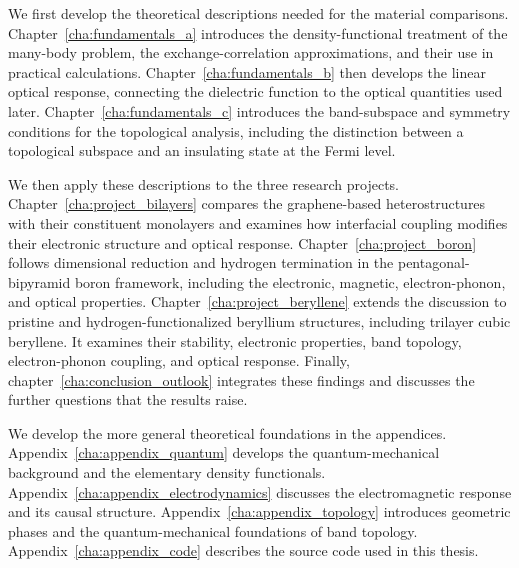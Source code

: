 We first develop the theoretical descriptions needed for the material comparisons.
Chapter~\ref{cha:fundamentals_a} introduces the density-functional treatment of the many-body problem, the exchange-correlation approximations, and their use in practical calculations.
Chapter~\ref{cha:fundamentals_b} then develops the linear optical response, connecting the dielectric function to the optical quantities used later.
Chapter~\ref{cha:fundamentals_c} introduces the band-subspace and symmetry conditions for the topological analysis, including the distinction between a topological subspace and an insulating state at the Fermi level.

We then apply these descriptions to the three research projects.
Chapter~\ref{cha:project_bilayers} compares the graphene-based heterostructures with their constituent monolayers and examines how interfacial coupling modifies their electronic structure and optical response.
Chapter~\ref{cha:project_boron} follows dimensional reduction and hydrogen termination in the pentagonal-bipyramid boron framework, including the electronic, magnetic, electron-phonon, and optical properties.
Chapter~\ref{cha:project_beryllene} extends the discussion to pristine and hydrogen-functionalized beryllium structures, including trilayer cubic beryllene.
It examines their stability, electronic properties, band topology, electron-phonon coupling, and optical response.
Finally, chapter~\ref{cha:conclusion_outlook} integrates these findings and discusses the further questions that the results raise.

We develop the more general theoretical foundations in the appendices.
Appendix~\ref{cha:appendix_quantum} develops the quantum-mechanical background and the elementary density functionals.
Appendix~\ref{cha:appendix_electrodynamics} discusses the electromagnetic response and its causal structure.
Appendix~\ref{cha:appendix_topology} introduces geometric phases and the quantum-mechanical foundations of band topology.
Appendix~\ref{cha:appendix_code} describes the source code used in this thesis.
